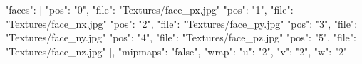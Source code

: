 {
    "faces": 
	[
        { "pos": "0", "file": "Textures/face_px.jpg" }
        { "pos": "1", "file": "Textures/face_nx.jpg" }
        { "pos": "2", "file": "Textures/face_py.jpg" }
        { "pos": "3", "file": "Textures/face_ny.jpg" }
        { "pos": "4", "file": "Textures/face_pz.jpg" }
        { "pos": "5", "file": "Textures/face_nz.jpg" }
    ],
    "mipmaps": "false",
	"wrap": { 
		"u": "2", 
		"v": "2", 
		"w": "2"
	}
}